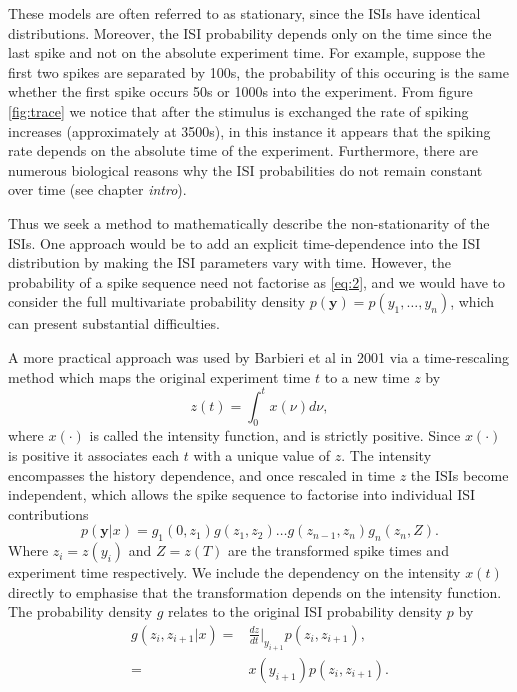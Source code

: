 \documentclass[../main.tex]{subfiles}
\begin{document}
These models are often referred to as stationary, since the ISIs have identical distributions. Moreover, the ISI probability depends only on the time since the last spike and not on the absolute experiment time. For example, suppose the first two spikes are separated by 100s, the probability of this occuring is the same whether the first spike occurs 50s or 1000s into the experiment. From figure \ref{fig:trace} we notice that after the stimulus is exchanged the rate of spiking increases (approximately at 3500s), in this instance it appears that the spiking rate depends on the absolute time of the experiment. Furthermore, there are numerous biological reasons why the ISI probabilities do not remain constant over time (see chapter {\it intro}). 

Thus we seek a method to mathematically describe the non-stationarity of the ISIs. One approach would be to add an explicit time-dependence into the ISI distribution by making the ISI parameters vary with time. However, the probability of a spike sequence need not factorise as \eqref{eq:2}, and we would have to consider the full multivariate probability density $p(\mathbf{y}) = p(y_1, \dots,y_n)$, which can present substantial difficulties.

A more practical approach was used by Barbieri et al in 2001 \cite{IntFn} via a time-rescaling method which maps the original experiment time $t$ to a new time $z$ by 
\begin{equation}\label{eq:3}
z(t) = \int^t_0 x(\nu ) d\nu, 
\end{equation}
where $x(\cdot)$ is called the intensity function, and is strictly positive. Since $x(\cdot)$ is positive it associates each $t$ with a unique value of $z$. The intensity encompasses the history dependence, and once rescaled in time $z$ the ISIs become independent, which allows the spike sequence to factorise into individual ISI contributions 
\begin{equation}\label{eq:4}
p(\mathbf{y} | x) = g_1(0, z_1)g(z_1, z_2) \dots g(z_{n-1},z_n) g_n(z_n, Z).
\end{equation} 
Where $z_i = z(y_i)$ and $Z = z(T)$ are the transformed spike times and experiment time respectively. We include the dependency on the intensity $x(t)$ directly to emphasise that the transformation depends on the intensity function. The probability density $g$ relates to the original ISI probability density $p$ by 
\begin{align} \label{eq:5}
g(z_i,z_{i+1} | x) =& \frac{dz}{dt} \bigg\rvert_{y_{i+1}} p(z_i, z_{i+1}),  \\
=& x(y_{i+1}) p(z_i, z_{i+1}). \label{eq:5b}
\end{align}
\end{document}

